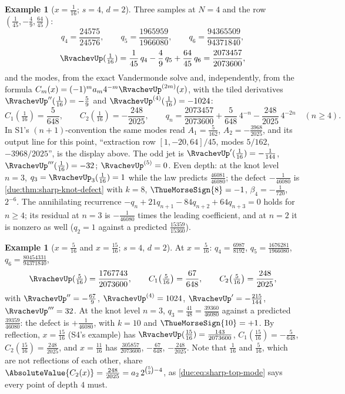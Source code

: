 \documentclass[11pt,oneside]{article}
\theoremstyle{plain}
\theoremstyle{definition}
\newtheorem{example}[theorem]{Example}
\theoremstyle{remark}
\newcommand{\upn}[1]{\RvachevUp_{#1}}
\newcommand{\am}[1]{a_{#1}}                                 %
\newcommand{\Cr}[2]{C_{#1}\!\left(#2\right)}                %
\newcommand{\qn}[1]{q_{#1}}                                 %
\begin{document}
\begin{example}[$x=\tfrac1{16}$; $s=4$, $d=2$]
\label{due:ex:exr-sixteenth}
Three samples at $N=4$ and the row $(\tfrac1{45},-\tfrac49,\tfrac{64}{45})$:
\[
 \qn{4}=\frac{24575}{24576},\qquad
 \qn{5}=\frac{1965959}{1966080},\qquad
 \qn{6}=\frac{94365509}{94371840},
\]
\[
 \RvachevUp(\tfrac1{16})
 =\frac{1}{45}\,\qn{4}-\frac49\,\qn{5}+\frac{64}{45}\,\qn{6}
 =\frac{2073457}{2073600},
\]
and the modes, from the exact Vandermonde solve and, independently, from
the formula $\Cr{m}{x}=(-1)^{m}\am{m}4^{-m}\RvachevUp^{(2m)}(x)$, with the
tiled derivatives $\RvachevUp''(\tfrac1{16})=-\tfrac59$ and
$\RvachevUp^{(4)}(\tfrac1{16})=-1024$:
\[
 \Cr{1}{\tfrac1{16}}=\frac{5}{648},\qquad
 \Cr{2}{\tfrac1{16}}=-\frac{248}{2025},\qquad
 \qn{n}=\frac{2073457}{2073600}+\frac{5}{648}\,4^{-n}-\frac{248}{2025}\,4^{-2n}
 \quad(n\ge4).
\]
In S1's $(n+1)$-convention the same modes read
$A_{1}=\tfrac5{162}$, $A_{2}=-\tfrac{3968}{2025}$, and its output line for
this point, ``extraction row $[1,-20,64]/45$, modes $5/162$, $-3968/2025$'',
is the display above.  The odd jet is $\RvachevUp'(\tfrac1{16})=-\tfrac1{144}$,
$\RvachevUp'''(\tfrac1{16})=-32$; $\RvachevUp^{(5)}=0$.  Even depth: at the
knot level $n=3$, $\qn{3}=\upn{3}(\tfrac1{16})=1$ while the law predicts
$\tfrac{46081}{46080}$; the defect $-\tfrac1{46080}$ is
\cref{due:thm:sharp-knot-defect} with $k=8$, $\ThueMorseSign{8}=-1$,
$\beta_{4}=-\tfrac1{720}$, $2^{-6}$.  The annihilating recurrence
$-\qn{n}+21\qn{n+1}-84\qn{n+2}+64\qn{n+3}=0$ holds for $n\ge4$; its residual
at $n=3$ is $-\tfrac1{46080}$ times the leading coefficient, and at $n=2$
it is nonzero as well ($\qn{2}=1$ against a predicted
$\tfrac{15359}{15360}$).
\end{example}

\begin{example}[$x=\tfrac5{16}$ and $x=\tfrac{15}{16}$; $s=4$, $d=2$]
\label{due:ex:exr-five-sixteenths}
At $x=\tfrac5{16}$: $\qn{4}=\tfrac{6987}{8192}$,
$\qn{5}=\tfrac{1676281}{1966080}$, $\qn{6}=\tfrac{80454331}{94371840}$,
\[
 \RvachevUp(\tfrac5{16})=\frac{1767743}{2073600},\qquad
 \Cr{1}{\tfrac5{16}}=\frac{67}{648},\qquad
 \Cr{2}{\tfrac5{16}}=\frac{248}{2025},
\]
with $\RvachevUp''=-\tfrac{67}9$, $\RvachevUp^{(4)}=1024$,
$\RvachevUp'=-\tfrac{215}{144}$, $\RvachevUp'''=32$.  At the knot level
$n=3$, $\qn{3}=\tfrac{41}{48}=\tfrac{39360}{46080}$ against a predicted
$\tfrac{39359}{46080}$: the defect is $+\tfrac1{46080}$, with $k=10$ and
$\ThueMorseSign{10}=+1$.  By reflection, $x=\tfrac{15}{16}$ (S4's example)
has $\RvachevUp(\tfrac{15}{16})=\tfrac{143}{2073600}$,
$\Cr{1}{\tfrac{15}{16}}=-\tfrac5{648}$, $\Cr{2}{\tfrac{15}{16}}=\tfrac{248}{2025}$,
and $x=\tfrac{11}{16}$ has $\tfrac{305857}{2073600}$, $-\tfrac{67}{648}$,
$-\tfrac{248}{2025}$.  Note that $\tfrac1{16}$ and $\tfrac5{16}$, which are
not reflections of each other, share $\AbsoluteValue{\Cr{2}{x}}=\tfrac{248}{2025}
=\am{2}\,2^{\binom52-4}$, as \cref{due:eq:sharp-top-mode} says every point
of depth $4$ must.
\end{example}
\end{document}
